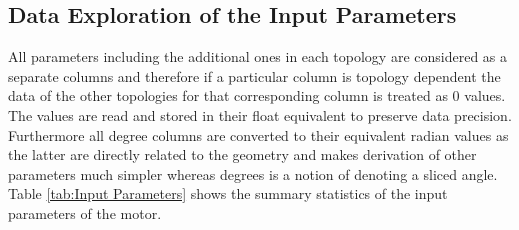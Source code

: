 \documentclass{report} %
\begin{document}
\subsection{Data Exploration of the Input Parameters}\label{sec:Deep Dive into Input Parameters}
All parameters including the additional ones in each topology are considered as a separate columns and therefore if a particular column is topology dependent the data of the other topologies for that corresponding column is treated as 0 values.\\
The values are read and stored in their float equivalent to preserve data precision. \\
Furthermore all degree columns are converted to their equivalent radian values as the latter are directly related to the geometry and makes derivation of other parameters much simpler whereas degrees is a notion of denoting a sliced angle.\\

Table \ref{tab:Input Parameters} shows the summary statistics of the input parameters of the motor. 
\end{document}
